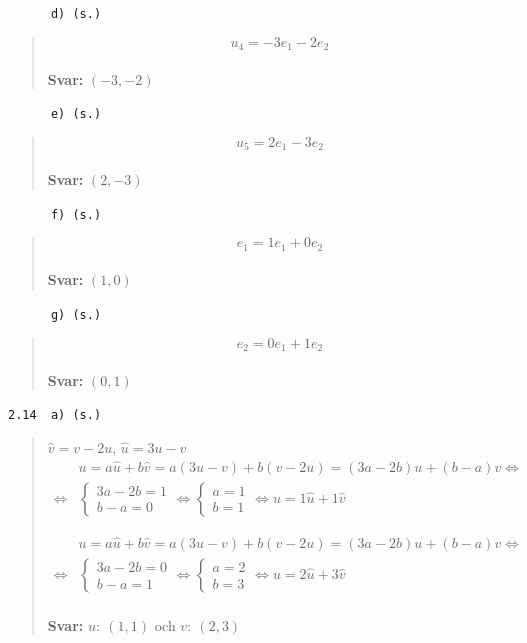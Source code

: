 \documentclass[a4paper]{article}
\newcommand{\tskcol}[1]{\textcolor{tskcol}{#1}}
\begin{document}
\texttt{\tskcol{~~~~~~d) (s.)}}
\begin{quotation}
	\noindent
	\[u_4=-3e_1-2e_2\]
	\\
	\textbf{Svar:} $(-3,-2)$
\end{quotation}

\texttt{\tskcol{~~~~~~e) (s.)}}
\begin{quotation}
	\noindent
	\[u_5=2e_1-3e_2\]
	\\
	\textbf{Svar:} $(2,-3)$
\end{quotation}

\texttt{\tskcol{~~~~~~f) (s.)}}
\begin{quotation}
	\noindent
	\[e_1=1e_1+0e_2\]
	\\
	\textbf{Svar:} $(1,0)$
\end{quotation}

\texttt{\tskcol{~~~~~~g) (s.)}}
\begin{quotation}
	\noindent
	\[e_2=0e_1+1e_2\]
	\\
	\textbf{Svar:} $(0,1)$
\end{quotation}

\pagebreak
\texttt{\tskcol{2.14~~a) (s.)}}
\begin{quotation}
	\noindent
	$\hat{v}=v-2u$, $\hat{u}=3u-v$
	\begin{align*}
	&u=a\hat{u}+b\hat{v}=
	a(3u-v)+b(v-2u)=
	(3a-2b)u+(b-a)v \Leftrightarrow \\ \Leftrightarrow
	&\begin{cases}
	3a-2b=1 \\
	b-a=0
	\end{cases} \Leftrightarrow
	\begin{cases}
	a=1 \\ 
	b=1
	\end{cases} \Leftrightarrow
	u=1\hat{u}+1\hat{v}
	\end{align*}
	
	\begin{align*}
	&u=a\hat{u}+b\hat{v}=
	a(3u-v)+b(v-2u)=
	(3a-2b)u+(b-a)v \Leftrightarrow \\ \Leftrightarrow
	&\begin{cases}
	3a-2b=0 \\
	b-a=1
	\end{cases} \Leftrightarrow
	\begin{cases}
	a=2 \\ 
	b=3
	\end{cases} \Leftrightarrow
	u=2\hat{u}+3\hat{v}
	\end{align*}
	\\
	\textbf{Svar:} $u:~(1,1)$ och $v:~(2,3)$
\end{quotation}
\end{document}
